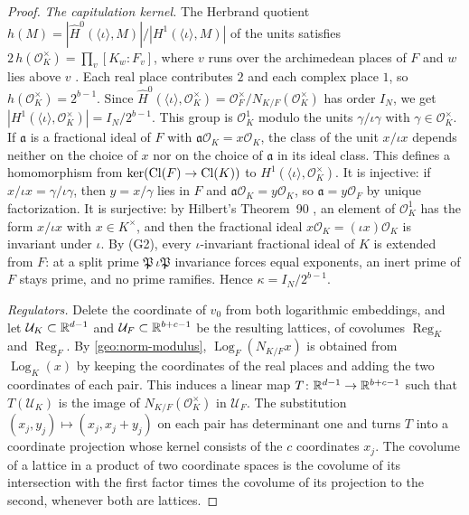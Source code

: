 \begin{proof}
\emph{The capitulation kernel.} The Herbrand quotient
$h(M)=|\widehat H^0(\langle\iota\rangle,M)|/|H^1(\langle\iota\rangle,M)|$
\cite[Chapter~II, \S3]{MilneCFT} of the units satisfies
$2\,h(\mathcal O_K^\times)=\prod_v[K_w:F_v]$, where $v$ runs over the
archimedean places of $F$ and $w$ lies above $v$
\cite[Chapter~VII, Proposition~3.1]{MilneCFT}. Each real place
contributes $2$ and each complex place $1$, so
$h(\mathcal O_K^\times)=2^{b-1}$. Since
$\widehat H^0(\langle\iota\rangle,\mathcal O_K^\times)=\mathcal
O_F^\times/N_{K/F}(\mathcal O_K^\times)$ has order $I_N$, we get
$|H^1(\langle\iota\rangle,\mathcal O_K^\times)|=I_N/2^{b-1}$. This group
is $\mathcal O_K^1$ modulo the units $\gamma/\iota\gamma$ with
$\gamma\in\mathcal O_K^\times$. If $\mathfrak a$ is a fractional ideal
of $F$ with $\mathfrak a\mathcal O_K=x\mathcal O_K$, the class of the
unit $x/\iota x$ depends neither on the choice of $x$ nor on the choice
of $\mathfrak a$ in its ideal class. This defines a homomorphism from
$\ker(\operatorname{Cl}(F)\to\operatorname{Cl}(K))$ to $H^1(\langle\iota\rangle,\mathcal O_K^\times)$.
It is injective: if $x/\iota x=\gamma/\iota\gamma$, then $y=x/\gamma$
lies in $F$ and $\mathfrak a\mathcal O_K=y\mathcal O_K$, so
$\mathfrak a=y\mathcal O_F$ by unique factorization. It is surjective:
by Hilbert's Theorem~90 \cite[Chapter~II, Corollary~1.23]{MilneCFT}, an
element of $\mathcal O_K^1$ has the form $x/\iota x$ with
$x\in K^\times$, and then the fractional ideal
$x\mathcal O_K=(\iota x)\mathcal O_K$ is invariant under $\iota$. By
(G2), every $\iota$-invariant fractional ideal of $K$ is extended from
$F$: at a split prime $\mathfrak P\,\iota\mathfrak P$ invariance forces
equal exponents, an inert prime of $F$ stays prime, and no prime
ramifies. Hence $\kappa=I_N/2^{b-1}$.

\emph{Regulators.} Delete the coordinate of $v_0$ from both logarithmic
embeddings, and let $\mathcal U_K\subset\mathbb R^{d-1}$ and
$\mathcal U_F\subset\mathbb R^{b+c-1}$ be the resulting lattices, of covolumes
$\operatorname{Reg}_K$ and $\operatorname{Reg}_F$. By
\eqref{geo:norm-modulus}, $\operatorname{Log}_F(N_{K/F}x)$ is obtained
from $\operatorname{Log}_K(x)$ by keeping the coordinates of the real
places and adding the two coordinates of each pair. This induces a
linear map $T\colon\mathbb R^{d-1}\to\mathbb R^{b+c-1}$ such that
$T(\mathcal U_K)$ is the image of $N_{K/F}(\mathcal O_K^\times)$ in
$\mathcal U_F$. The substitution $(x_j,y_j)\mapsto(x_j,x_j+y_j)$ on each
pair has determinant one and turns $T$ into a coordinate projection
whose kernel consists of the $c$ coordinates $x_j$. The covolume of a
lattice in a product of two coordinate spaces is the covolume of its
intersection with the first factor times the covolume of its projection
to the second, whenever both are lattices.


\end{proof}
